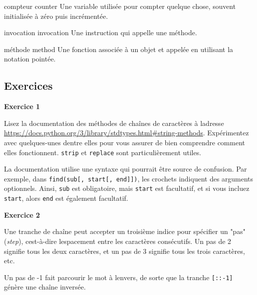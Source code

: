 compteur counter Une variable utilisée pour compter quelque chose,
souvent initialisée à zéro puis incrémentée.

invocation invocation Une instruction qui appelle une méthode.

méthode method Une fonction associée à un objet et appelée en utilisant
la notation pointée.

\hypertarget{exercices}{%
\subsection{Exercices}\label{exercices}}

\textbf{Exercice 1}

Lisez la documentation des méthodes de chaînes de caractères à
l\textquotesingle adresse
\url{https://docs.python.org/3/library/stdtypes.html\#string-methods}.
Expérimentez avec quelques-unes d\textquotesingle entre elles pour vous
assurer de bien comprendre comment elles fonctionnent. \texttt{strip} et
\texttt{replace} sont particulièrement utiles.

La documentation utilise une syntaxe qui pourrait être source de
confusion. Par exemple, dans
\texttt{find(sub{[},\ start{[},\ end{]}{]})}, les crochets indiquent des
arguments optionnels. Ainsi, \texttt{sub} est obligatoire, mais
\texttt{start} est facultatif, et si vous incluez \texttt{start}, alors
\texttt{end} est également facultatif.

\textbf{Exercice 2}

Une tranche de chaîne peut accepter un troisième indice pour spécifier
un "pas" (\emph{step}), c\textquotesingle est-à-dire
l\textquotesingle espacement entre les caractères consécutifs. Un pas de
2 signifie tous les deux caractères, et un pas de 3 signifie tous les
trois caractères, etc.

\begin{Shaded}
\begin{Highlighting}[]
\OperatorTok{\textgreater{}\textgreater{}\textgreater{}}\OperatorTok{=} 
\OperatorTok{\textgreater{}\textgreater{}\textgreater{}}\NormalTok{ fruit[}\NormalTok{:}\NormalTok{:}\NormalTok{]}
\end{Highlighting}
\end{Shaded}

Un pas de -1 fait parcourir le mot à l\textquotesingle envers, de sorte
que la tranche \texttt{{[}::-1{]}} génère une chaîne inversée.

